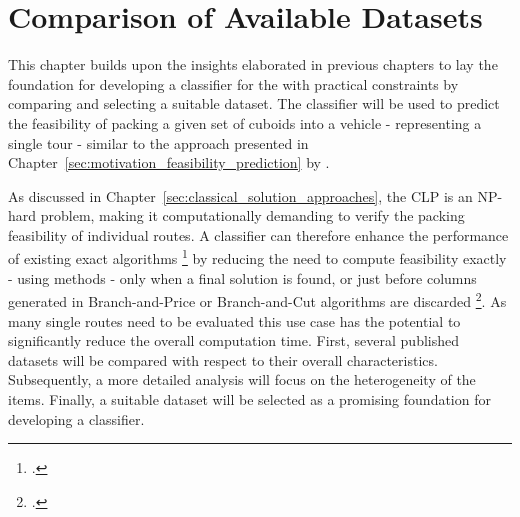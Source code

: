 \chapter{Comparison of Available Datasets}
\label{sec:dataset_selection}

This chapter builds upon the insights elaborated in previous chapters to lay the foundation
for developing a classifier for the  with practical constraints by comparing and
selecting a suitable dataset. The classifier will be used to predict the feasibility of packing a
given set of cuboids into a vehicle - representing a single tour - similar to the approach presented
in Chapter~\ref{sec:motivation_feasibility_prediction} by \citeauthor{zhang_learning-based_2022}.

As discussed in Chapter~\ref{sec:classical_solution_approaches}, the \gls{CLP} is an NP-hard problem,
making it computationally demanding to verify the packing feasibility of individual routes.
A classifier can therefore enhance the performance of existing exact algorithms \footcite[cf.][]{tamke_branch-and-cut_2024}
by reducing the need to compute feasibility exactly - using  methods - only when a
final solution is found, or just before columns generated in Branch-and-Price or Branch-and-Cut
algorithms are discarded \footcite[cf.][pp. 9--11]{zhang_learning-based_2022}. As many single routes
need to be evaluated this use case has the potential to significantly reduce the overall
computation time. First, several published  datasets will be compared with respect
to their overall characteristics. Subsequently, a more detailed analysis will focus on the
heterogeneity of the items. Finally, a suitable dataset will be selected as a promising foundation
for developing a classifier.




